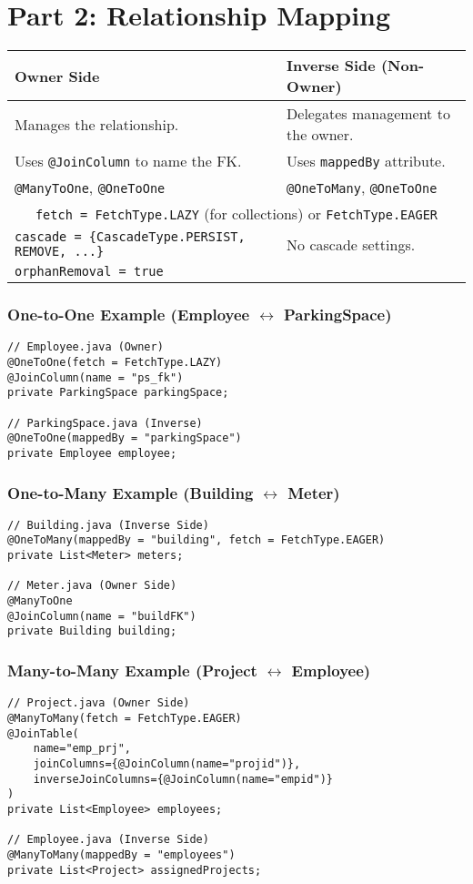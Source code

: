 \section*{Part 2: Relationship Mapping}
\begin{center}
\begin{tabular}{|l|l|}
\hline
\textbf{Owner Side} & \textbf{Inverse Side (Non-Owner)} \\
\hline
Manages the relationship. & Delegates management to the owner. \\
Uses \texttt{@JoinColumn} to name the FK. & Uses \texttt{mappedBy} attribute. \\
\hline
\texttt{@ManyToOne}, \texttt{@OneToOne} & \texttt{@OneToMany}, \texttt{@OneToOne} \\
\hline
\multicolumn{2}{|c|}{\texttt{fetch = FetchType.LAZY} (for collections) or \texttt{FetchType.EAGER}} \\
\hline
\texttt{cascade = \{CascadeType.PERSIST, REMOVE, ...\}} & No cascade settings. \\
\texttt{orphanRemoval = true} & \\
\hline
\end{tabular}
\end{center}

\subsubsection*{One-to-One Example (Employee $\leftrightarrow$ ParkingSpace)}
\begin{verbatim}
// Employee.java (Owner)
@OneToOne(fetch = FetchType.LAZY)
@JoinColumn(name = "ps_fk")
private ParkingSpace parkingSpace;

// ParkingSpace.java (Inverse)
@OneToOne(mappedBy = "parkingSpace")
private Employee employee;
\end{verbatim}

\subsubsection*{One-to-Many Example (Building $\leftrightarrow$ Meter)}
\begin{verbatim}
// Building.java (Inverse Side)
@OneToMany(mappedBy = "building", fetch = FetchType.EAGER)
private List<Meter> meters;

// Meter.java (Owner Side)
@ManyToOne
@JoinColumn(name = "buildFK")
private Building building;
\end{verbatim}

\subsubsection*{Many-to-Many Example (Project $\leftrightarrow$ Employee)}
\begin{verbatim}
// Project.java (Owner Side)
@ManyToMany(fetch = FetchType.EAGER)
@JoinTable(
    name="emp_prj",
    joinColumns={@JoinColumn(name="projid")},
    inverseJoinColumns={@JoinColumn(name="empid")}
)
private List<Employee> employees;

// Employee.java (Inverse Side)
@ManyToMany(mappedBy = "employees")
private List<Project> assignedProjects;
\end{verbatim}

